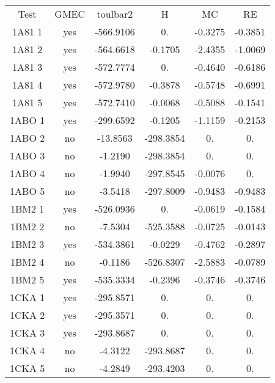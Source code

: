     \begin{table}[h]
      \centering

      \begin{tabular}{cccccc}


        \toprule
        Test & GMEC & toulbar2 & H & MC & RE \\
        \cmidrule{1-6}
        1A81 1 & yes  &  -566.9106 & 0. & -0.3275 & -0.3851 \\         
        1A81 2 & yes  &  -564.6618 & -0.1705 & -2.4355 & -1.0069 \\   
        1A81 3 & yes  &  -572.7774 & 0. & -0.4640 & -0.6186 \\         
        1A81 4 & yes  &  -572.9780 & -0.3878 & -0.5748 & -0.6991 \\    
        1A81 5 & yes  &  -572.7410 & -0.0068 & -0.5088 & -0.1541 \\    
        1ABO 1 & yes  &  -299.6592 & -0.1205 & -1.1159 & -0.2153 \\   
        1ABO 2 & no   &  -13.8563  & -298.3854 & 0. & 0. \\               
        1ABO 3 & no   &  -1.2190   & -298.3854 & 0. & 0. \\                 
        1ABO 4 & no   &  -1.9940   & -297.8545 & -0.0076 & 0. \\            
        1ABO 5 & no   &  -3.5418   & -297.8009 & -0.9483 & -0.9483 \\       
        1BM2 1 & yes  &  -526.0936 & 0. & -0.0619 & -0.1584 \\         
        1BM2 2 & no   &  -7.5304   & -525.3588 & -0.0725 & -0.0143 \\     
        1BM2 3 & yes  &  -534.3861 & -0.0229 & -0.4762 & -0.2897 \\    
        1BM2 4 & no   &  -0.1186   & -526.8307 & -2.5883 & -0.0789 \\     
        1BM2 5 & yes  &  -535.3334 & -0.2396 & -0.3746 & -0.3746 \\    
        1CKA 1 & yes  & -295.8571  & 0.& 0. & 0. \\                   
        1CKA 2 & yes  & -295.3571  & 0. & 0. & 0. \\                   
        1CKA 3 & yes  & -293.8687  & 0. & 0. & 0.\\                   
        1CKA 4 & no   &  -4.3122   & -293.8687 & 0. & 0. \\               
        1CKA 5 & no   &  -4.2849   & -293.4203 & 0. & 0. \\           

\end{tabular}
\end{table}
